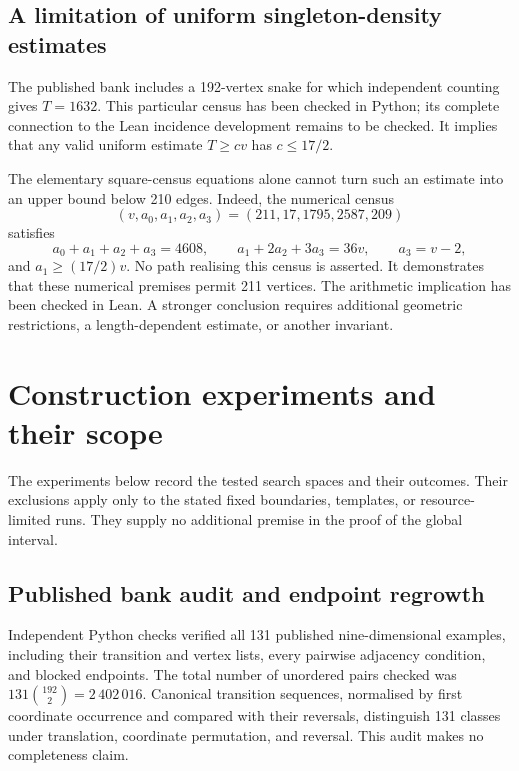 \documentclass[11pt,a4paper]{article}
\theoremstyle{definition}
\theoremstyle{remark}
\begin{document}
\subsection{A limitation of uniform singleton-density estimates}
The published bank includes a 192-vertex snake for which independent counting gives $T=1632$. This particular census has been checked in Python; its complete connection to the Lean incidence development remains to be checked. It implies that any valid uniform estimate $T\ge cv$ has $c\le17/2$.

The elementary square-census equations alone cannot turn such an estimate into an upper bound below 210 edges. Indeed, the numerical census
\[
(v,a_0,a_1,a_2,a_3)=(211,17,1795,2587,209)
\]
satisfies
\[
a_0+a_1+a_2+a_3=4608,\qquad
 a_1+2a_2+3a_3=36v,\qquad a_3=v-2,
\]
and $a_1\ge(17/2)v$. No path realising this census is asserted. It demonstrates that these numerical premises permit 211 vertices. The arithmetic implication has been checked in Lean. A stronger conclusion requires additional geometric restrictions, a length-dependent estimate, or another invariant.

\section{Construction experiments and their scope}\label{app:experiments}
The experiments below record the tested search spaces and their outcomes. Their exclusions apply only to the stated fixed boundaries, templates, or resource-limited runs. They supply no additional premise in the proof of the global interval.

\subsection{Published bank audit and endpoint regrowth}
Independent Python checks verified all 131 published nine-dimensional examples, including their transition and vertex lists, every pairwise adjacency condition, and blocked endpoints. The total number of unordered pairs checked was $131\binom{192}{2}=2\,402\,016$. Canonical transition sequences, normalised by first coordinate occurrence and compared with their reversals, distinguish 131 classes under translation, coordinate permutation, and reversal. This audit makes no completeness claim.
\end{document}
